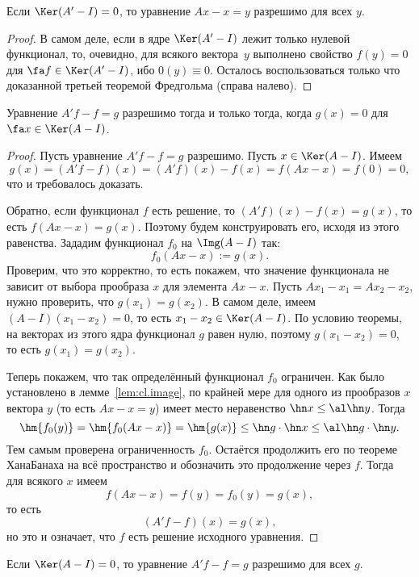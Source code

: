\documentclass[a4paper]{article}
\begin{document}
\begin{imp}
Если $\Ker(A'-I) = 0$, то уравнение $Ax - x = y$ разрешимо для всех $y$.
\end{imp}
\begin{proof}
В самом деле, если в ядре $\Ker(A'-I)$ лежит только нулевой функционал, то, очевидно, для
всякого вектора~$y$ выполнено свойство $f(y) = 0$ для $\fa f \in \Ker(A'-I)$, ибо $0(y) \equiv 0$.
Осталось воспользоваться только что доказанной третьей теоремой Фредгольма (справа налево).
\end{proof}

\begin{theorem}
Уравнение $A'f-f = g$ разрешимо тогда и только тогда, когда $g(x) = 0$ для $\fa x \in \Ker(A-I)$.
\end{theorem}
\begin{proof}
Пусть уравнение $A'f-f = g$ разрешимо. Пусть $x \in \Ker(A - I)$.
Имеем
$$g(x) = (A'f-f)(x) = (A'f)(x) - f(x) = f(Ax-x) = f(0) = 0,$$
что и требовалось доказать.

Обратно, если функционал $f$ есть решение, то $(A'f)(x) - f(x) = g(x)$, то есть $f(Ax-x) = g(x)$.
Поэтому будем конструировать его, исходя из этого равенства.
Зададим функционал $f_0$ на $\Img(A - I)$ так:
$$f_0(Ax-x) := g(x).$$
Проверим, что это корректно, то есть покажем, что значение функционала не зависит от выбора
прообраза $x$ для элемента $Ax - x$. Пусть $Ax_1 - x_1 = Ax_2 - x_2$, нужно
проверить, что $g(x_1) = g(x_2)$. В самом деле,
имеем $(A-I)(x_1-x_2) = 0$, то есть $x_1 - x_2 \in \Ker(A-I)$. По условию теоремы, на
векторах из этого ядра функционал $g$ равен нулю, поэтому $g(x_1 - x_2) = 0$,
то есть $g(x_1) = g(x_2)$.

Теперь покажем, что так определённый функционал $f_0$ ограничен.
Как было установлено в лемме~\ref{lem:cl.image}, по крайней мере для
одного из прообразов $x$ вектора $y$ (то есть $Ax - x = y$) имеет место неравенство $\hn x \le \al \hn y$.
Тогда
$$\hm{f_0(y)} = \hm{f_0(Ax-x)} = \hm{g(x)} \le \hn g \cdot \hn x \le  \al \hn g\cdot\hn y.$$
Тем самым проверена ограниченность $f_0$. Остаётся продолжить его по теореме Хана\ч Банаха
на всё пространство и обозначить это продолжение через $f$. Тогда для всякого $x$ имеем
$$f(Ax -x) = f(y) = f_0(y) = g(x),$$
то есть
$$(A'f-f)(x) = g(x),$$
но  это и означает, что $f$ есть решение исходного уравнения.
\end{proof}

\begin{imp}
Если $\Ker(A-I) = 0$, то уравнение $A'f - f = g$ разрешимо для всех $g$.
\end{imp}
\end{document}
